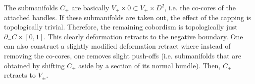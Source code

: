The submanifolds $C_\pm$ are basically $V_\pm \times 0 \subset V_\pm \times D^2$, i.e. 
the co-cores of the attached handles.
If these submanifolds are taken out, the effect of the capping is topologically trivial.
Therefore, the remaining cobordism is topologically just $\partial_- C\times [0,1]$.
This clearly deformation retracts to the negative boundary.
One can also construct a slightly modified deformation retract where instead 
of removing the co-cores, one removes slight push-offs 
(i.e. submanifolds that are obtained by shifting $C_\pm$ aside by a section of its normal bundle).
Then, $C_\pm$ retracts to $V_\pm$.